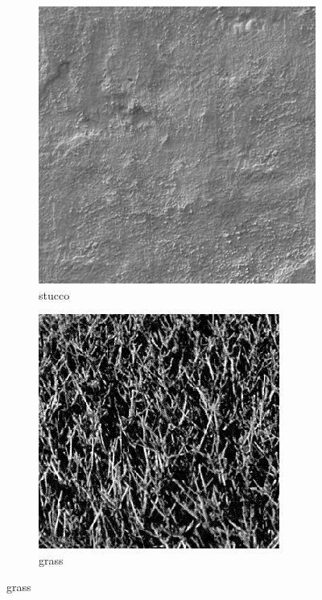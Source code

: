 \documentclass[11pt]{article}
\begin{document}
\begin{figure}[ht!]
\begin{subfigure}[]{0.333\linewidth}
        \includegraphics[width=\linewidth]{figs_for_latex_only/image2.png}
        \caption{stucco}
    \end{subfigure}%
    \hfill%
    \begin{subfigure}[]{0.333\linewidth}
        \centering
        \includegraphics[width=\linewidth]{figs_for_latex_only/image3.png}
        \caption{grass}
    \end{subfigure}%
\end{figure}
\end{document}
